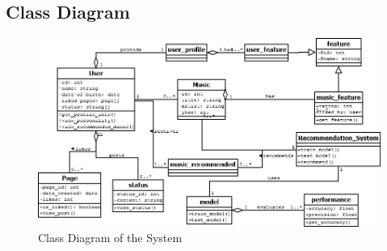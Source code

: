 \subsection{Class Diagram}
\begin{figure}[!ht]
\centering
\includegraphics[width = 16 cm]{fig/class.png}
\caption{Class Diagram of the System}
\label{fig:class}
\end{figure}

\newpage
